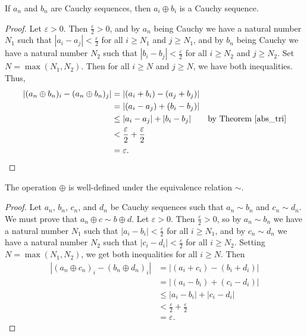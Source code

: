 \documentclass[../../math.tex]{subfiles}
\begin{document}
\begin{lemma}
    If $a_n$ and $b_n$ are Cauchy sequences, then $a_i \oplus b_i$ is a Cauchy
    sequence.
\end{lemma}
\begin{proof}
    Let $\varepsilon > 0$.  Then $\frac{\varepsilon}{2} > 0$, and by $a_n$ being
    Cauchy we have a natural number $N_1$ such that $|a_i - a_j| <
    \frac{\varepsilon}{2}$ for all $i \geq N_1$ and $j \geq N_1$, and by $b_n$
    being Cauchy we have a natural number $N_2$ such that $|b_i - b_j| <
    \frac{\varepsilon}{2}$ for all $i \geq N_2$ and $j \geq N_2$.  Set $N =
    \max(N_1, N_2)$.  Then for all $i \geq N$ and $j \geq N$, we have both
    inequalities.  Thus,
    \begin{align*}
        |(a_n \oplus b_n)_i - (a_n \oplus b_n)_j|
        &= |(a_i + b_i) - (a_j + b_j)| && \\
        &= |(a_i - a_j) + (b_i - b_j)| && \\
        &\leq |a_i - a_j| + |b_i - b_j| && \text{by Theorem \ref{abs_tri}} \\
        &< \frac{\varepsilon}{2} + \frac{\varepsilon}{2} && \\
        &= \varepsilon.
    \end{align*}
\end{proof}

\begin{lemma}
    The operation $\oplus$ is well-defined under the equivalence relation
    $\sim$.
\end{lemma}
\begin{proof}
    Let $a_n$, $b_n$, $c_n$, and $d_n$ be Cauchy sequences such that $a_n \sim
    b_n$ and $c_n \sim d_n$.  We must prove that $a_n \oplus c \sim b \oplus d$.
    Let $\varepsilon > 0$.  Then $\frac{\varepsilon}{2} > 0$, so by $a_n \sim
    b_n$ we have a natural number $N_1$ such that $|a_i - b_i| <
    \frac{\varepsilon}{2}$ for all $i \geq N_1$, and by $c_n \sim d_n$ we have a
    natural number $N_2$ such that $|c_i - d_i| < \frac{\varepsilon}{2}$ for all
    $i \geq N_2$.  Setting $N = \max(N_1, N_2)$, we get both inequalities for
    all $i \geq N$.  Then
    \begin{align*}
        |(a_n \oplus c_n)_i - (b_n \oplus d_n)_i|
        &= |(a_i + c_i) - (b_i + d_i)| \\
        &= |(a_i - b_i) + (c_i - d_i)| \\
        &\leq |a_i - b_i| + |c_i - d_i| \\
        &< \frac{\varepsilon}{2} + \frac{\varepsilon}{2} \\
        &= \varepsilon.
    \end{align*}
\end{proof}
\end{document}
